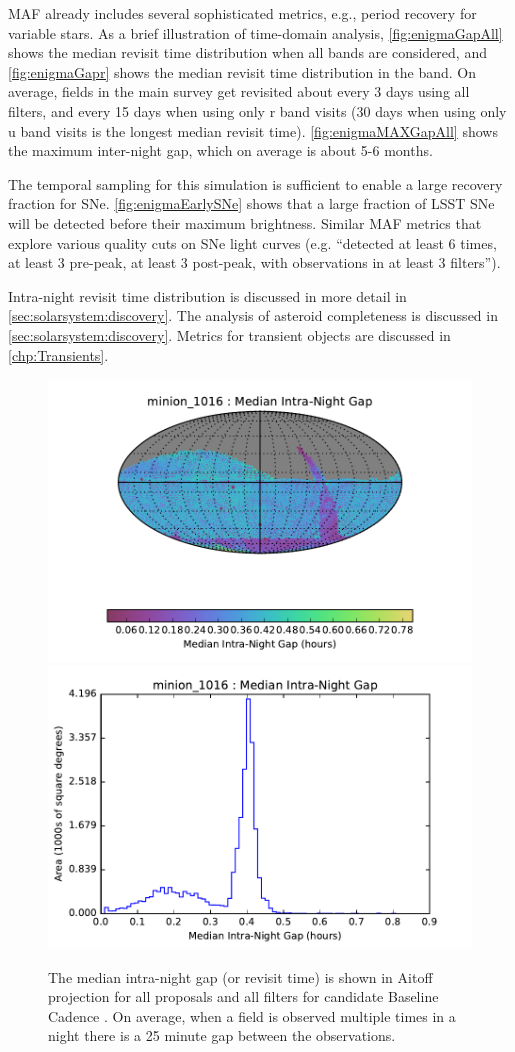 MAF already includes
several sophisticated metrics, e.g., period recovery for variable
stars.  As a brief illustration of time-domain analysis,
\autoref{fig:enigmaGapAll} shows the median revisit time distribution
when all bands are considered, and \autoref{fig:enigmaGapr} shows the
median revisit time distribution in the band.  On average, fields in
the main survey get revisited about every 3 days using all filters,
and every 15 days when using only r band visits (30 days when using
only u band visits is the longest median revisit time).
\autoref{fig:enigmaMAXGapAll} shows the maximum inter-night gap, which
on average is about 5-6 months.

The temporal sampling for this simulation is sufficient to enable a
large recovery fraction for SNe. \autoref{fig:enigmaEarlySNe} shows
that a large fraction of LSST SNe will be detected before their
maximum brightness. Similar MAF metrics that explore various quality
cuts on SNe light curves (e.g. ``detected at least 6 times, at least 3
pre-peak, at least 3 post-peak, with observations in at least 3
filters'').

Intra-night revisit time distribution is discussed in more detail in
\autoref{sec:solarsystem:discovery}. The analysis of asteroid completeness is
discussed in \autoref{sec:solarsystem:discovery}. Metrics for transient objects
are discussed in \autoref{chp:Transients}.



\begin{figure}[t!]
\vskip -0.0in
\includegraphics[angle=0,width=0.49\hsize,clip]{figs/cadence/minion_1016_Median_Intra-Night_Gap_HEAL_SkyMap.pdf}
\includegraphics[angle=0,width=0.49\hsize,clip]{figs/cadence/minion_1016_Median_Intra-Night_Gap_HEAL_Histogram.pdf}
\vskip -0.1in
\caption{The median intra-night gap (or revisit time) is shown in Aitoff projection
for all proposals and all filters for candidate Baseline Cadence .
On average, when a field is observed multiple times in a night there is a 25 minute gap between the observations.}
\label{fig:enigmaInterGapAll}
\end{figure}


